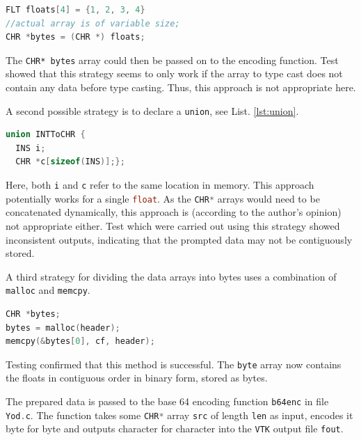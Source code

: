 \begin{lstlisting}[language=C, caption=Segmentation approach via type casting with pointers, label=lst:typecasting]
FLT floats[4] = {1, 2, 3, 4}
//actual array is of variable size;
CHR *bytes = (CHR *) floats;
\end{lstlisting}

The \lstinline{CHR* bytes} array could then be passed on to the encoding function. Test showed that this strategy seems to only work if the array to type cast does not contain any data before type casting. Thus, this approach is not appropriate here.

\bigbreak
A second possible strategy is to declare a \lstinline{union}, see List. \ref{lst:union}.

\begin{lstlisting}[language=C, caption=Segmentation approach via a union, label=lst:union]
union INTToCHR {
  INS i;
  CHR *c[sizeof(INS)];};
\end{lstlisting}

Here, both \lstinline[language=C]{i} and \lstinline[language=C]{c} refer to the same location in memory. This approach potentially works for a single \lstinline[language=C]{float}. As the \lstinline[language=C]{CHR*} arrays would need to be concatenated dynamically, this approach is (according to the author's opinion) not appropriate either. Test which were carried out using this strategy showed inconsistent outputs, indicating that the prompted data may not be contiguously stored.

\bigbreak
A third strategy for dividing the data arrays into bytes uses a combination of \lstinline[language=C]{malloc} and \lstinline[language=C]{memcpy}.

\begin{lstlisting}[language=C, caption=Segmentation approach via memcpy, label=mallocandmemcpy]
CHR *bytes;
bytes = malloc(header);
memcpy(&bytes[0], cf, header);
\end{lstlisting}

Testing confirmed that this method is successful. The \lstinline[language=C]{byte} array now contains the floats in contiguous order in binary form, stored as bytes. 

\bigbreak
The prepared data is passed to the base 64 encoding function \lstinline[language=C]{b64enc} in file \lstinline[language=C]{Yod.c}. The function takes some \lstinline[language=C]{CHR*} array \lstinline[language=C]{src} of length \lstinline[language=C]{len} as input, encodes it byte for byte and outputs character for character into the \texttt{VTK} output file \lstinline[language=C]{fout}. 

